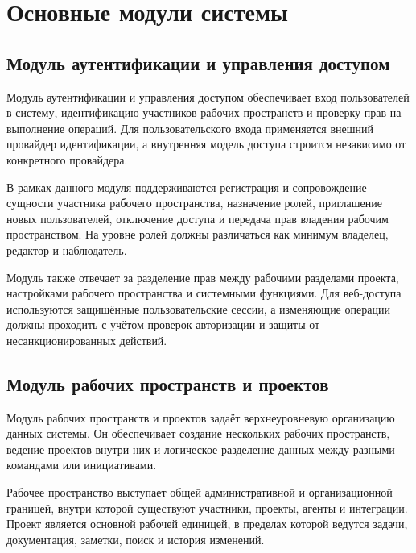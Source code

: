 \section{Основные модули системы}

\newcommand{\algorithmheading}[1]{\par{\leftskip=\parindent\noindent\refstepcounter{subsubsection}\normalfont\fontsize{14pt}{16pt}\selectfont\thesubsubsection\quad #1\par}}

\subsection{Модуль аутентификации и управления доступом}

\headingtextsep

Модуль аутентификации и управления доступом обеспечивает вход пользователей в систему, идентификацию участников рабочих пространств и проверку прав на выполнение операций. Для пользовательского входа применяется внешний провайдер идентификации, а внутренняя модель доступа строится независимо от конкретного провайдера.

В рамках данного модуля поддерживаются регистрация и сопровождение сущности участника рабочего пространства, назначение ролей, приглашение новых пользователей, отключение доступа и передача прав владения рабочим пространством. На уровне ролей должны различаться как минимум владелец, редактор и наблюдатель.

Модуль также отвечает за разделение прав между рабочими разделами проекта, настройками рабочего пространства и системными функциями. Для веб-доступа используются защищённые пользовательские сессии, а изменяющие операции должны проходить с учётом проверок авторизации и защиты от несанкционированных действий.

\textheadingsep
\subsection{Модуль рабочих пространств и проектов}

\headingtextsep

Модуль рабочих пространств и проектов задаёт верхнеуровневую организацию данных системы. Он обеспечивает создание нескольких рабочих пространств, ведение проектов внутри них и логическое разделение данных между разными командами или инициативами.

Рабочее пространство выступает общей административной и организационной границей, внутри которой существуют участники, проекты, агенты и интеграции. Проект является основной рабочей единицей, в пределах которой ведутся задачи, документация, заметки, поиск и история изменений.

